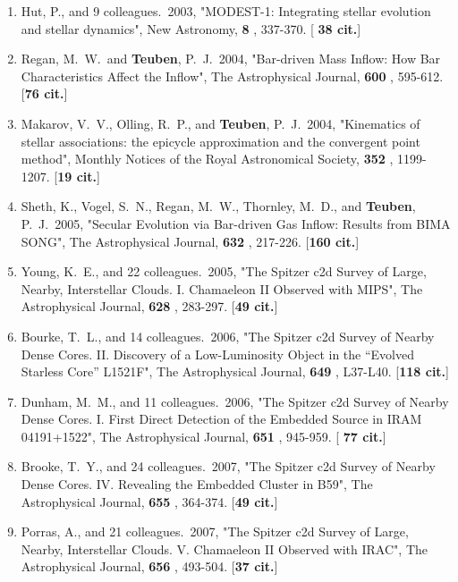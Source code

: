\documentclass[11pt,letterpaper]{article}
\begin{document}
\begin{enumerate}[label=\textbf{\arabic*}.]
\item  
Hut, P., and 9 colleagues.\  2003,  "MODEST-1: Integrating stellar 
evolution and stellar dynamics", New Astronomy,  {\bf 8} , 337-370.  [{\bf 
38 cit.}] 

\item  
Regan, M.~W.~and {\bf Teuben}, P.~J.\  2004,  "Bar-driven Mass Inflow: How Bar 
Characteristics Affect the Inflow", The Astrophysical Journal,  {\bf 600} , 
595-612.  [{\bf 76 cit.}] 

\item  
Makarov, V.~V., Olling, R.~P., and {\bf Teuben}, P.~J.\  2004,  "Kinematics of 
stellar associations: the epicycle approximation and the convergent point 
method", Monthly Notices of the Royal Astronomical Society,  {\bf 352} , 
1199-1207.  [{\bf 19 cit.}] 


\item  
Sheth, K., Vogel, S.~N., Regan, M.~W., Thornley, M.~D., and {\bf Teuben}, P.~J.\  
2005,  "Secular Evolution via Bar-driven Gas Inflow: Results from BIMA 
SONG", The Astrophysical Journal,  {\bf 632} , 217-226.  [{\bf 160 cit.}]

\item  
Young, K.~E., and 22 colleagues.\  2005,  "The Spitzer c2d Survey of Large, 
Nearby, Interstellar Clouds. I. Chamaeleon II Observed with MIPS", The 
Astrophysical Journal,  {\bf 628} , 283-297.  [{\bf 49 cit.}] 


\item  
Bourke, T.~L., and 14 colleagues.\  2006,  "The Spitzer c2d Survey of 
Nearby Dense Cores. II. Discovery of a Low-Luminosity Object in the 
``Evolved Starless Core'' L1521F", The Astrophysical Journal,  {\bf 649} , 
L37-L40.  [{\bf 118 cit.}] 

\item  
Dunham, M.~M., and 11 colleagues.\  2006,  "The Spitzer c2d Survey of 
Nearby Dense Cores. I. First Direct Detection of the Embedded Source in 
IRAM 04191+1522", The Astrophysical Journal,  {\bf 651} , 945-959.  [{\bf 
77 cit.}] 

\item  
Brooke, T.~Y., and 24 colleagues.\  2007,  "The Spitzer c2d Survey of 
Nearby Dense Cores. IV. Revealing the Embedded Cluster in B59", The 
Astrophysical Journal,  {\bf 655} , 364-374.  [{\bf 49 cit.}] 

\item  
Porras, A., and 21 colleagues.\  2007,  "The Spitzer c2d Survey of Large, 
Nearby, Interstellar Clouds. V. Chamaeleon II Observed with IRAC", The 
Astrophysical Journal,  {\bf 656} , 493-504.  [{\bf 37 cit.}] 


\end{enumerate}
\end{document}
